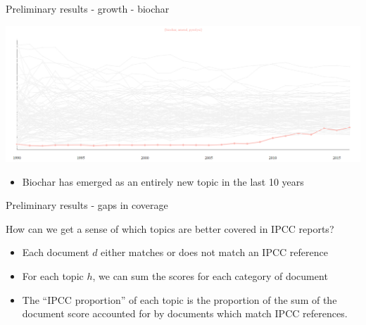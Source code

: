 \documentclass[9pt]{beamer}
\begin{document}
\begin{frame}{Preliminary results - growth - biochar}


		\begin{center}
			\includegraphics[width=\linewidth]{../plots/biochar_growth.png}

		\medskip

			\begin{itemize}
				\item Biochar has emerged as an entirely new topic in the last 10 years
			\end{itemize}
		\end{center}

\end{frame}

\begin{frame}{Preliminary results - gaps in coverage}

How can we get a sense of which topics are better covered in IPCC reports?

\begin{itemize}
	\item Each document \(d\) either matches or does not match an IPCC reference
	\item For each topic \(h\), we can sum the scores for each category of document
	\item The ``IPCC proportion'' of each topic is the proportion of the sum of the document score accounted for by documents which match IPCC references.
\end{itemize}



\end{frame}
\end{document}
